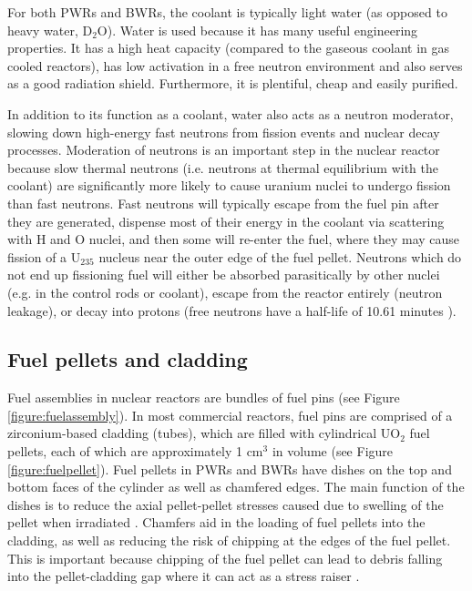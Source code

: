 For both PWRs and BWRs, the coolant is typically light water (as opposed to heavy water, D$_{2}$O). Water is used because it has many useful engineering properties. It has a high heat capacity (compared to the gaseous coolant in gas cooled reactors), has low activation in a free neutron environment and also serves as a good radiation shield. Furthermore, it is plentiful, cheap and easily purified.

In addition to its function as a coolant, water also acts as a neutron moderator, slowing down high-energy fast neutrons from fission events and nuclear decay processes. Moderation of neutrons is an important step in the nuclear reactor because slow thermal neutrons (i.e. neutrons at thermal equilibrium with the coolant) are significantly more likely to cause uranium nuclei to undergo fission than fast neutrons. Fast neutrons will typically escape from the fuel pin after they are generated, dispense most of their energy in the coolant via scattering with H and O nuclei, and then some will re-enter the fuel, where they may cause fission of a U$_{235}$ nucleus near the outer edge of the fuel pellet. Neutrons which do not end up fissioning fuel will either be absorbed parasitically by other nuclei (e.g. in the control rods or coolant), escape from the reactor entirely (neutron leakage), or decay into protons (free neutrons have a half-life of 10.61 minutes \cite{Christensen1972}).

\subsection{Fuel pellets and cladding} \label{ss_fuelpin}

Fuel assemblies in nuclear reactors are bundles of fuel pins (see Figure \ref{figure:fuelassembly}). In most commercial reactors, fuel pins are comprised of a zirconium-based cladding (tubes), which are filled with cylindrical UO$_{2}$ fuel pellets, each of which are approximately 1 cm$^{3}$ in volume (see Figure \ref{figure:fuelpellet}). Fuel pellets in PWRs and BWRs have dishes on the top and bottom faces of the cylinder as well as chamfered edges. The main function of the dishes is  to reduce the axial pellet-pellet stresses caused due to swelling of the pellet when irradiated \cite{marino2005crack}. Chamfers aid in the loading of fuel pellets into the cladding, as well as reducing the risk of chipping at the edges of the fuel pellet. This is important because chipping of the fuel pellet can lead to debris falling into the pellet-cladding gap where it can act as a stress raiser \cite{doerr2015nuclear}.

